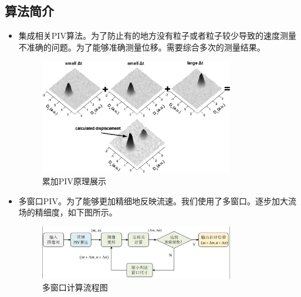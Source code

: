\documentclass[12pt]{article}
\begin{document}
\subsection{算法简介}
\begin{itemize}
    \item 集成相关PIV算法。为了防止有的地方没有粒子或者粒子较少导致的速度测量不准确的问题。为了能够准确测量位移。需要综合多次的测量结果。
    \begin{figure}[H]
        \centering
        \includegraphics[width=0.8\textwidth]{Images/累加PIV原理展示.png}
        \caption{累加PIV原理展示}
    \end{figure}
    \item 多窗口PIV。为了能够更加精细地反映流速。我们使用了多窗口。逐步加大流场的精细度，如下图所示。
    \begin{figure}[H]
        \centering
        \includegraphics[width=0.8\textwidth]{Images/多窗口示意图.png}
        \caption{多窗口计算流程图}
    \end{figure}
\end{itemize}
\end{document}
